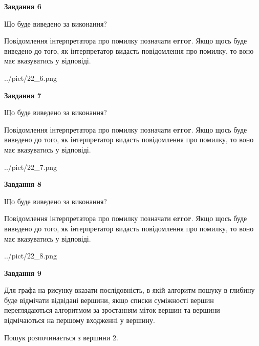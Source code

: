 \documentclass[12pt, ukrainian]{article}
\begin{document}
{\begin {large}
{\begin {center}\textbf{Завдання 6}\end {center}}\par
Що буде виведено за виконання?

Повідомлення інтерпретатора про помилку позначати \textbf{error}.
Якщо щось буде виведено до того, як інтерпретатор видасть повідомлення про помилку, 
то воно має вказуватись у відповіді. \par


\begin{center}
	{../pict/22_6.png}
\end{center}
\newpage

{\begin {center}\textbf{Завдання 7}\end {center}}\par
Що буде виведено за виконання?

Повідомлення інтерпретатора про помилку позначати \textbf{error}.
Якщо щось буде виведено до того, як інтерпретатор видасть повідомлення про помилку, 
то воно має вказуватись у відповіді. \par


\begin{center}
	{../pict/22_7.png}
\end{center}
\newpage

{\begin {center}\textbf{Завдання 8}\end {center}}\par
Що буде виведено за виконання?

Повідомлення інтерпретатора про помилку позначати \textbf{error}.
Якщо щось буде виведено до того, як інтерпретатор видасть повідомлення про помилку, 
то воно має вказуватись у відповіді. \par


\begin{center}
	{../pict/22_8.png}
\end{center}
\newpage

{\begin {center}\textbf{Завдання 9}\end {center}}\par
Для графа на рисунку вказати послідовність, в якій алгоритм пошуку в глибину буде відмічати відвідані вершини, якщо списки суміжності вершин переглядаються алгоритмом за зростанням міток вершин та вершини відмічаються на першому вход\-женні у вершину.\par
Пошук розпочинається з вершини 2.\par


\end{large}}
\end{document}
